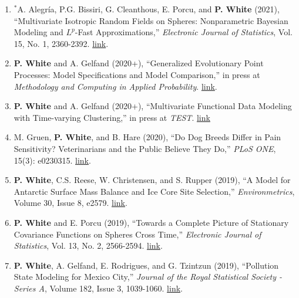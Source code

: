 \documentclass[12pt]{article}
\begin{document}
\begin{enumerate}[label=$\bullet$]
\item $^*$A. Alegr\'ia, P.G. Bissiri, G. Cleanthous, E. Porcu, and \textbf{P. White} (2021), ``Multivariate Isotropic Random  Fields on Spheres: Nonparametric Bayesian Modeling and $L^p$-Fast Approximations,'' \emph{Electronic Journal of Statistics}, Vol. 15, No. 1,  2360-2392. \href{https://doi.org/10.1214/19-EJS1593}{link}.
\item \textbf{P. White} and A. Gelfand (2020+), ``Generalized Evolutionary Point Processes: Model Specifications and Model Comparison,'' in press at  \emph{Methodology and Computing in Applied Probability}. \href{https://doi.org/10.1007/s11009-020-09797-8}{link}.
\item \textbf{P. White} and A. Gelfand (2020+), ``Multivariate Functional Data Modeling with Time-varying Clustering,'' in press at \textit{TEST}. \href{http://link.springer.com/article/10.1007/s11749-020-00733-z}{link}
\item M. Gruen, \textbf{P. White}, and B. Hare (2020), ``Do Dog Breeds Differ in Pain Sensitivity? Veterinarians and the Public Believe They Do,'' \emph{PLoS ONE}, 15(3): e0230315. \href{https://doi.org/10.1371/journal.pone.0230315}{link}.
\item \textbf{P. White}, C.S. Reese, W. Christensen, and S. Rupper (2019), ``A Model for Antarctic Surface Mass Balance and Ice Core Site Selection,'' \emph{Environmetrics}, Volume 30, Issue 8, e2579. \href{https://onlinelibrary.wiley.com/doi/abs/10.1002/env.2579}{link}.
\item \textbf{P. White} and E. Porcu (2019), ``Towards a Complete Picture of Stationary Covariance Functions on Spheres Cross Time,'' \emph{Electronic Journal of Statistics}, Vol. 13, No. 2, 2566-2594. \href{https://doi.org/10.1214/19-EJS1593}{link}.
\item \textbf{P. White}, A. Gelfand, E. Rodrigues, and G. Tzintzun (2019), ``Pollution State Modeling for Mexico City,'' \emph{Journal of the Royal Statistical Society - Series A}, Volume 182, Issue 3, 1039-1060. \href{https://rss.onlinelibrary.wiley.com/doi/abs/10.1111/rssa.12444}{link}.

\end{enumerate}
\end{document}
